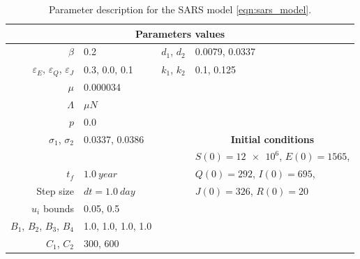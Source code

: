 \begin{table}[htb]
    \begin{center}
      \begin{tabular}{@{}rlrl@{}}
        \toprule
        \multicolumn{4}{c}{\bf{Parameters values}}
        \\
        \midrule
        $\beta$
          & \num{0.2}
          & $d_1$, $d_2$
          & \num{0.0079}, \num{0.0337}
        \\
        $\varepsilon_E$, 
        $\varepsilon_Q$,
        $\varepsilon_J$
          & \num{0.3}, \num{0.0}, \num{0.1}
          &
          $k_1$, $k_2$ 
          & 
            \num{0.1},
            \num{0.125}
          \\
        $\mu$
          & \num{0.000034}
        \\
        $\Lambda$
          & $\mu N$
        \\
        $p$
          & \num{0.0}
        \\
        $\sigma_1$, $\sigma_2$
          & \num{0.0337}, \num{0.0386}
          && \multicolumn{1}{c}{\bf{Initial conditions}}
        \\
        \cmidrule{4-4}
          &&& $S(0)=\num{12e6}$, $E(0)=1565$,
         \\
        $t_f$
          & $\SI{1.0}{year}$
          && $Q(0)=292$, $I(0)=\num{695}$,
        \\
        Step size
        & $dt=\SI{1.0}{day}$
        && $J(0)=\num{326}$, $R(0)=\num{20}$
        \\
        $u_i$ bounds
          & \num{.05}, \num{0.5}
        \\
        $B_1$, $B_2$, $B_3$, $B_4$
        & \num{1.0}, \num{1.0}, \num{1.0}, \num{1.0}
        \\
        $C_1$, $C_2$
        & \num{300}, \num{600}
        \\
        \bottomrule
      \end{tabular}
     \caption{Parameter description for the SARS model
     \eqref{eqn:sars_model}.}
     \label{tbl:sars_table}
     \end{center}
\end{table}

